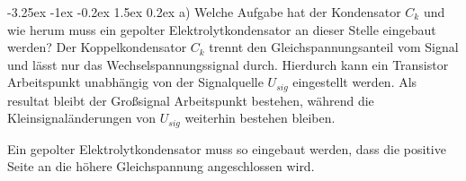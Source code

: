 \documentclass[
	a4paper, %
	12pt, %
]{CSUniSchoolLabReport}
\makeatletter
\renewcommand\paragraph{\@startsection{paragraph}{4}{\z@}%
  {-3.25ex \@plus -1ex \@minus -0.2ex}%
  {1.5ex \@plus 0.2ex}%
  {\normalfont\normalsize\bfseries}}
\makeatother
\begin{document}
\paragraph{a) Welche Aufgabe hat der Kondensator $C_k$ und wie herum muss ein gepolter Elektrolytkondensator an dieser Stelle eingebaut werden?}
Der Koppelkondensator $C_k$ trennt den Gleichspannungsanteil vom Signal und lässt nur das Wechselspannungssignal durch.
Hierdurch kann ein Transistor Arbeitspunkt unabhängig von der Signalquelle $U_{sig}$ eingestellt werden. Als resultat bleibt der Großsignal Arbeitspunkt bestehen, während die Kleinsignaländerungen von $U_{sig}$ weiterhin bestehen bleiben. 



Ein gepolter Elektrolytkondensator muss so eingebaut werden, dass die positive Seite an die höhere Gleichspannung angeschlossen wird.

















\end{document}
